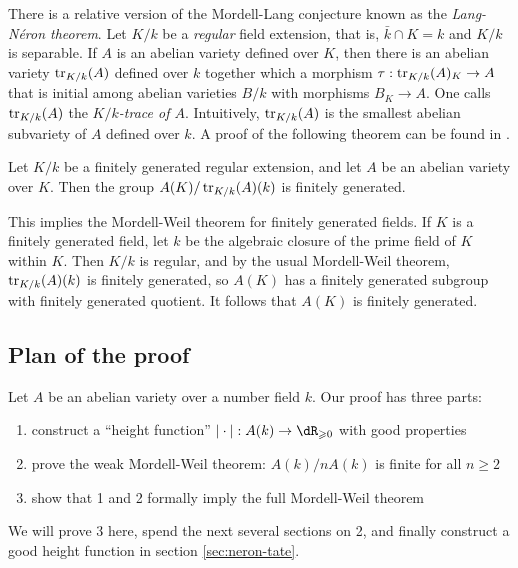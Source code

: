 There is a relative version of the Mordell-Lang conjecture known as the 
\emph{Lang-N\'eron theorem}. Let $K/k$ be a \emph{regular} field extension, 
that is, $\bar k\cap K = k$ and $K/k$ is separable. If $A$ is an abelian 
variety defined over $K$, then there is an abelian variety 
$\operatorname{tr}_{K/k}(A)$ defined over $k$ together which a morphism 
$\tau:\operatorname{tr}_{K/k}(A)_K\to A$ that is initial among abelian 
varieties $B/k$ with morphisms $B_K\to A$. One calls 
$\operatorname{tr}_{K/k}(A)$ the \emph{$K/k$-trace of $A$}. Intuitively, 
$\operatorname{tr}_{K/k}(A)$ is the smallest abelian subvariety of $A$ defined 
over $k$. A proof of the following theorem can be found in \cite{co06}. 

\begin{theorem}
Let $K/k$ be a finitely generated regular extension, and let $A$ be an abelian 
variety over $K$. Then the group $A(K)/\operatorname{tr}_{K/k}(A)(k)$ is 
finitely generated.
\end{theorem}

This implies the Mordell-Weil theorem for finitely generated fields. If $K$ is 
a finitely generated field, let $k$ be the algebraic closure of the prime field 
of $K$ within $K$. Then $K/k$ is regular, and by the usual Mordell-Weil 
theorem, $\operatorname{tr}_{K/k}(A)(k)$ is finitely generated, so $A(K)$ has a 
finitely generated subgroup with finitely generated quotient. It follows that 
$A(K)$ is finitely generated.





\subsection{Plan of the proof}

Let $A$ be an abelian variety over a number field $k$. Our proof has three 
parts:
\begin{enumerate}
  \item construct a ``height function'' $|\cdot|:A(k)\to \dR_{\geqslant 0}$ 
    with good properties
  \item prove the weak Mordell-Weil theorem: $A(k)/n A(k)$ is finite for all 
    $n\geqslant 2$
  \item show that 1 and 2 formally imply the full Mordell-Weil theorem 
\end{enumerate}
We will prove 3 here, spend the next several sections on 2, and finally 
construct a good height function in section \ref{sec:neron-tate}. 

